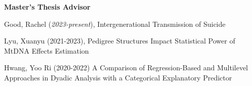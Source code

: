 {\large\textbf{Master's Thesis Advisor}}
\begin{etaremune}%
\item Good, Rachel  (\textit{2023-present}), Intergenerational Transmission of Suicide%
\item Lyu, Xuanyu  (2021-2023), Pedigree Structures Impact Statistical Power of MtDNA Effects Estimation%
\item Hwang, Yoo Ri (2020-2022) A Comparison of Regression-Based and Multilevel Approaches in Dyadic Analysis with a Categorical Explanatory Predictor%
\end{etaremune}%
